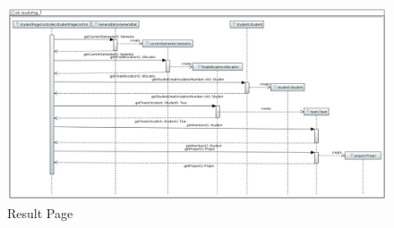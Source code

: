 \documentclass[parskip=full]{scrartcl}
\begin{document}
\begin{figure}
\centering
\includegraphics[width=\linewidth]{bilder/seqResultPage.png}
\caption{Result Page}
\label{seq:resultPage}
\end{figure}
\end{document}
